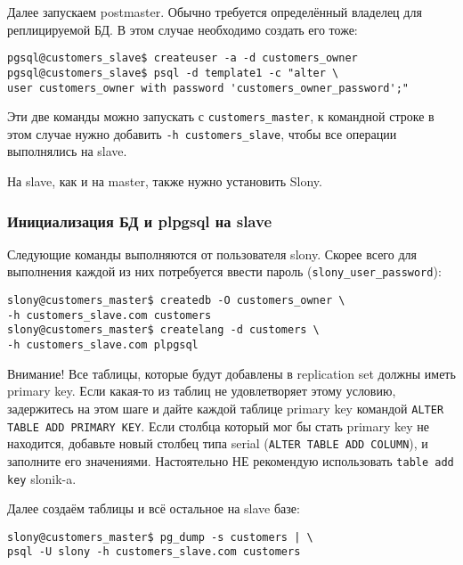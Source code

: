 Далее запускаем postmaster. Обычно требуется определённый владелец для реплицируемой БД. В этом случае необходимо создать его тоже:

\begin{lstlisting}[label=lst:slony5,caption=Подготовка одного slave-сервера]
pgsql@customers_slave$ createuser -a -d customers_owner
pgsql@customers_slave$ psql -d template1 -c "alter \
user customers_owner with password 'customers_owner_password';"
\end{lstlisting}

Эти две команды можно запускать с \lstinline!customers_master!, к командной строке в этом случае нужно добавить \lstinline!-h customers_slave!, чтобы все операции выполнялись на slave.

На slave, как и на master, также нужно установить Slony.

\subsubsection{Инициализация БД и plpgsql на slave}

Следующие команды выполняются от пользователя slony. Скорее всего для выполнения каждой из них потребуется ввести пароль (\lstinline!slony_user_password!):

\begin{lstlisting}[label=lst:slony6,caption=Инициализация БД и plpgsql на slave]
slony@customers_master$ createdb -O customers_owner \
-h customers_slave.com customers
slony@customers_master$ createlang -d customers \
-h customers_slave.com plpgsql
\end{lstlisting}

Внимание! Все таблицы, которые будут добавлены в replication set должны иметь primary key. Если какая-то из таблиц не удовлетворяет этому условию, задержитесь на этом шаге и дайте каждой таблице primary key командой \lstinline!ALTER TABLE ADD PRIMARY KEY!. Если столбца который мог бы стать primary key не находится, добавьте новый столбец типа serial (\lstinline!ALTER TABLE ADD COLUMN!), и заполните его значениями. Настоятельно НЕ рекомендую использовать \lstinline!table add key! slonik-a.

Далее создаём таблицы и всё остальное на slave базе:

\begin{lstlisting}[label=lst:slony7,caption=Инициализация БД и plpgsql на slave]
slony@customers_master$ pg_dump -s customers | \
psql -U slony -h customers_slave.com customers
\end{lstlisting}

